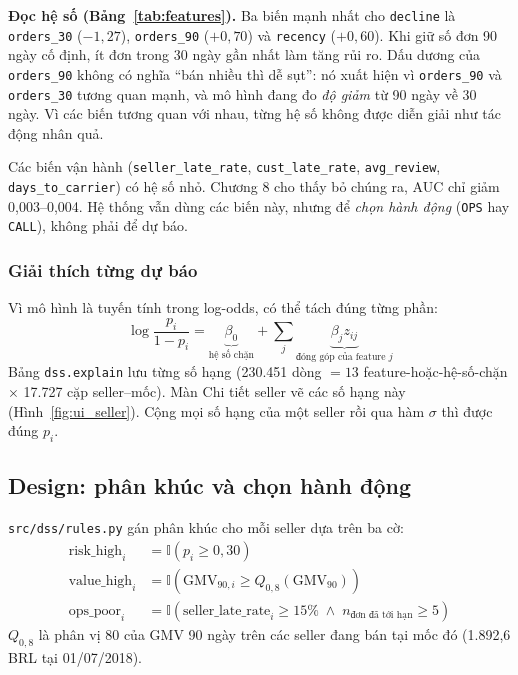 \textbf{Đọc hệ số (Bảng~\ref{tab:features}).} Ba biến mạnh nhất cho \texttt{decline} là \texttt{orders\_30} ($-1{,}27$), \texttt{orders\_90} ($+0{,}70$) và \texttt{recency} ($+0{,}60$). Khi giữ số đơn 90 ngày cố định, ít đơn trong 30 ngày gần nhất làm tăng rủi ro. Dấu dương của \texttt{orders\_90} không có nghĩa ``bán nhiều thì dễ sụt'': nó xuất hiện vì \texttt{orders\_90} và \texttt{orders\_30} tương quan mạnh, và mô hình đang đo \emph{độ giảm} từ 90 ngày về 30 ngày. Vì các biến tương quan với nhau, từng hệ số không được diễn giải như tác động nhân quả.

Các biến vận hành (\texttt{seller\_late\_rate}, \texttt{cust\_late\_rate}, \texttt{avg\_review}, \texttt{days\_to\_carrier}) có hệ số nhỏ. Chương 8 cho thấy bỏ chúng ra, AUC chỉ giảm 0,003--0,004. Hệ thống vẫn dùng các biến này, nhưng để \emph{chọn hành động} (\texttt{OPS} hay \texttt{CALL}), không phải để dự báo.

\subsubsection*{Giải thích từng dự báo}
Vì mô hình là tuyến tính trong log-odds, có thể tách đúng từng phần:
\begin{equation}
\log\frac{p_i}{1-p_i} = \underbrace{\beta_0}_{\text{hệ số chặn}} + \sum_{j} \underbrace{\beta_j z_{ij}}_{\text{đóng góp của feature } j}
\end{equation}
Bảng \texttt{dss.explain} lưu từng số hạng (230.451 dòng $= 13$ feature-hoặc-hệ-số-chặn $\times$ 17.727 cặp seller--mốc). Màn Chi tiết seller vẽ các số hạng này (Hình~\ref{fig:ui_seller}). Cộng mọi số hạng của một seller rồi qua hàm $\sigma$ thì được đúng $p_i$.

\subsection{Design: phân khúc và chọn hành động}
\texttt{src/dss/rules.py} gán phân khúc cho mỗi seller dựa trên ba cờ:
\begin{align}
\text{risk\_high}_i &= \mathbb{I}(p_i \ge 0{,}30) \\
\text{value\_high}_i &= \mathbb{I}(\text{GMV}_{90,i} \ge Q_{0{,}8}(\text{GMV}_{90})) \\
\text{ops\_poor}_i &= \mathbb{I}(\text{seller\_late\_rate}_i \ge 15\% \;\land\; n_{\text{đơn đã tới hạn}} \ge 5)
\end{align}
$Q_{0{,}8}$ là phân vị 80 của GMV 90 ngày trên các seller đang bán tại mốc đó (1.892,6 BRL tại 01/07/2018).

